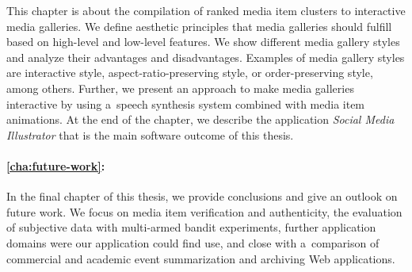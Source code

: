 This chapter is about the compilation of ranked media item clusters
to interactive media galleries.
We define aesthetic principles that media galleries should fulfill
based on high-level and low-level features.
We show different media gallery styles and analyze their 
advantages and disadvantages.
Examples of media gallery styles are interactive style, aspect-ratio-preserving style, or order-preserving style, among others. 
Further, we present an approach to make media galleries interactive
by using a~speech synthesis system combined with media item animations.
At the end of the chapter, we describe the application
\emph{Social Media Illustrator} that is
the main software outcome of this thesis.

\paragraph{\autoref{cha:future-work}:}

In the final chapter of this thesis,
we provide conclusions and give an outlook on future work.
We focus on media item verification and authenticity,
the evaluation of subjective data with multi-armed bandit experiments,
further application domains were our application could find use,
and close with a~comparison of commercial and academic event summarization
and archiving Web applications.


\clearpage

